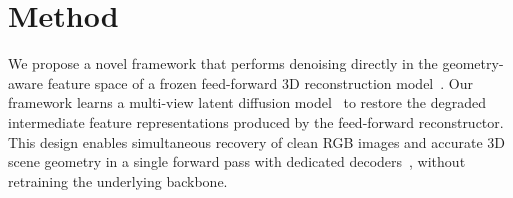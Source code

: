 \documentclass{llmxive}
\begin{document}



\section{Method}
We propose a novel framework that performs denoising directly in the geometry-aware feature space of a frozen feed-forward 3D reconstruction model~\cite{depthanything3}. Our framework learns a multi-view latent diffusion model~\cite{wang2025ddt, zheng2025diffusion} to restore the degraded intermediate feature representations produced by the feed-forward reconstructor. This design enables simultaneous recovery of clean RGB images and accurate 3D scene geometry in a single forward pass with dedicated decoders~\cite{depthanything3, jang2026gld}, without retraining the underlying backbone.
\end{document}
